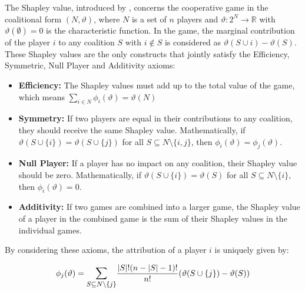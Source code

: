 \documentclass{article} %
\theoremstyle{bfnote}
\begin{document}
The Shapley value, introduced by \cite{shapley1952}, concerns the cooperative game in the coalitional form $(N, \vartheta)$, where $N$ is a set of $n$ players and $\vartheta: 2^N \rightarrow \mathbb{R}$ with $\vartheta(\emptyset)=0$ is the characteristic function. In the game, the marginal contribution of the player $i$ to any coalition $S$ with $i \notin S$ is considered as $\vartheta(S \cup i)-\vartheta(S)$. These Shapley values are the only constructs that jointly satisfy the Efficiency, Symmetric, Null Player and Additivity axioms:

\begin{itemize}
	
	\item \textbf{Efficiency:} The Shapley values must add up to the total value of the game, which means $\sum_{i \in N} \phi_i(\vartheta) = \vartheta(N)$
	\item \textbf{Symmetry:} If two players are equal in their contributions to any coalition, they should receive the same Shapley value. Mathematically, if \(\vartheta(S \cup \{i\}) = \vartheta(S \cup \{j\})\) for all \(S \subseteq N \setminus \{i, j\}\), then \(\phi_i(\vartheta) = \phi_j(\vartheta)\).
	\item \textbf{Null Player:} If a player has no impact on any coalition, their Shapley value should be zero. Mathematically, if \(\vartheta(S \cup \{i\}) = \vartheta(S)\) for all \(S \subseteq N \setminus \{i\}\), then \(\phi_i(\vartheta) = 0\).
	\item \textbf{Additivity:} If two games are combined into a larger game, the Shapley value of a player in the combined game is the sum of their Shapley values in the individual games.
	
\end{itemize}

 By considering these axioms, the attribution of a player $i$ is uniquely given by:

\begin{equation*}
	\phi_j(\vartheta)=\mathlarger{\sum\limits_{S \subseteq N \backslash\{j\}}} \frac{|S| !(n-|S|-1) !}{n !}(\vartheta(S \cup\{j\})-\vartheta(S))
\end{equation*}
\end{document}
